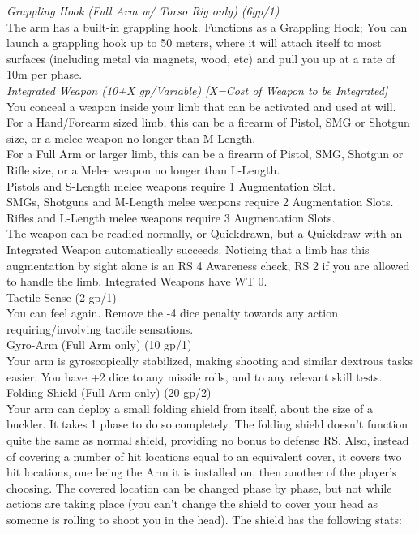 \documentclass[a4paper, twocolumn, openany]{book}
\begin{document}
{	{\slshape Grappling Hook (Full Arm w/ Torso Rig only) (6gp/1)\\}
	The arm has a built-in grappling hook. Functions as a Grappling Hook; You can launch a
	grappling hook up to 50 meters, where it will attach itself to most surfaces (including metal via
	magnets, wood, etc) and pull you up at a rate of 10m per phase.\\

	{\slshape Integrated Weapon (10+X gp/Variable) [X=Cost of Weapon to be Integrated]\\}
	You conceal a weapon inside your limb that can be activated and used at will.\\
	For a Hand/Forearm sized limb, this can be a firearm of Pistol, SMG or Shotgun size, or a melee
	weapon no longer than M-Length.\\
	For a Full Arm or larger limb, this can be a firearm of Pistol, SMG, Shotgun or Rifle size, or a
	Melee weapon no longer than L-Length.\\
	Pistols and S-Length melee weapons require 1 Augmentation Slot.\\
	SMGs, Shotguns and M-Length melee weapons require 2 Augmentation Slots.\\
	Rifles and L-Length melee weapons require 3 Augmentation Slots.\\
	The weapon can be readied normally, or Quickdrawn, but a Quickdraw with an Integrated
	Weapon automatically succeeds. Noticing that a limb has this augmentation by sight alone is an
	RS 4 Awareness check, RS 2 if you are allowed to handle the limb. Integrated Weapons have
	WT 0.\\

	Tactile Sense (2 gp/1)\\
	You can feel again. Remove the -4 dice penalty towards any action requiring/involving tactile
	sensations.\\

	Gyro-Arm (Full Arm only) (10 gp/1)\\
	Your arm is gyroscopically stabilized, making shooting and similar dextrous tasks easier. You
	have +2 dice to any missile rolls, and to any relevant skill tests.\\

	Folding Shield (Full Arm only) (20 gp/2)\\
	Your arm can deploy a small folding shield from itself, about the size of a buckler. It takes 1
	phase to do so completely. The folding shield doesn’t function quite the same as normal shield,
	providing no bonus to defense RS. Also, instead of covering a number of hit locations equal to
	an equivalent cover, it covers two hit locations, one being the Arm it is installed on, then another
	of the player’s choosing. The covered location can be changed phase by phase, but not while
	actions are taking place (you can’t change the shield to cover your head as someone is rolling
	to shoot you in the head). The shield has the following stats:\\

}
\end{document}
